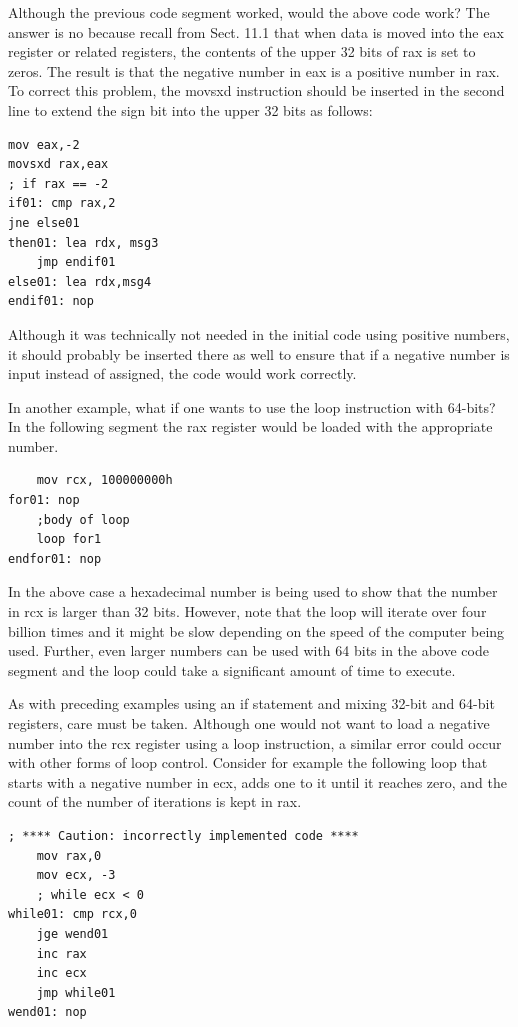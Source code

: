 \documentclass[10pt]{article}
\begin{document}
Although the previous code segment worked, would the above code work? The answer is no because recall from Sect. 11.1 that when data is moved into the eax register or related registers, the contents of the upper 32 bits of rax is set to zeros. The result is that the negative number in eax is a positive number in rax. To correct this problem, the movsxd instruction should be inserted in the second line to extend the sign bit into the upper 32 bits as follows:

\begin{verbatim}
mov eax,-2
movsxd rax,eax
; if rax == -2
if01: cmp rax,2
jne else01
then01: lea rdx, msg3
    jmp endif01
else01: lea rdx,msg4
endif01: nop
\end{verbatim}

Although it was technically not needed in the initial code using positive numbers, it should probably be inserted there as well to ensure that if a negative number is input instead of assigned, the code would work correctly.

In another example, what if one wants to use the loop instruction with 64-bits? In the following segment the rax register would be loaded with the appropriate number.

\begin{verbatim}
    mov rcx, 100000000h
for01: nop
    ;body of loop
    loop for1
endfor01: nop
\end{verbatim}

In the above case a hexadecimal number is being used to show that the number in rcx is larger than 32 bits. However, note that the loop will iterate over four billion times and it might be slow depending on the speed of the computer being used. Further, even larger numbers can be used with 64 bits in the above code segment and the loop could take a significant amount of time to execute.

As with preceding examples using an if statement and mixing 32-bit and 64-bit registers, care must be taken. Although one would not want to load a negative number into the rcx register using a loop instruction, a similar error could occur with other forms of loop control. Consider for example the following loop that starts with a negative number in ecx, adds one to it until it reaches zero, and the count of the number of iterations is kept in rax.

\begin{verbatim}
; **** Caution: incorrectly implemented code ****
    mov rax,0
    mov ecx, -3
    ; while ecx < 0
while01: cmp rcx,0
    jge wend01
    inc rax
    inc ecx
    jmp while01
wend01: nop
\end{verbatim}
\end{document}
